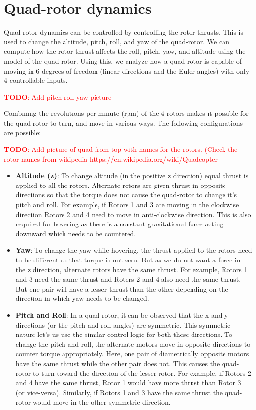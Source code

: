 \documentclass[BTech]{iitmdiss}
\newcommand\todo[1]{\textcolor{red}{{\bf TODO}: #1}}
\begin{document}
\chapter{Quad-rotor dynamics}

Quad-rotor dynamics can be controlled by controlling the rotor thrusts. This is used to change the altitude, pitch, roll, and yaw of the quad-rotor. We can compute how the rotor thrust affects the roll, pitch, yaw, and altitude using the model of the quad-rotor. Using this, we analyze how a quad-rotor is capable of moving in 6 degrees of freedom (linear directions and the Euler angles) with only 4 controllable inputs.

\todo{Add pitch roll yaw picture}

Combining the revolutions per minute (rpm) of the 4 rotors makes it possible for the quad-rotor to turn, and move in various ways. The following configurations are possible:

\todo{Add picture of quad from top with names for the rotors. (Check the rotor names from wikipedia https://en.wikipedia.org/wiki/Quadcopter}

\begin{itemize}
\item{{\bf Altitude (z)}: To change altitude (in the positive z direction) equal thrust is applied to all the rotors. Alternate rotors are given thrust in opposite directions so that the torque does not cause the quad-rotor to change it's pitch and roll. For example, if Rotors 1 and 3 are moving in the clockwise direction Rotors 2 and 4 need to move in anti-clockwise direction. This is also required for hovering as there is a constant gravitational force acting downward which needs to be countered.}
\item{{\bf Yaw}: To change the yaw while hovering, the thrust applied to the rotors need to be different so that torque is not zero. But as we do not want a force in the z direction, alternate rotors have the same thrust. For example, Rotors 1 and 3 need the same thrust and Rotors 2 and 4 also need the same thrust. But one pair will have a lesser thrust than the other depending on the direction in which yaw needs to be changed.}
\item{{\bf Pitch and Roll}: In a quad-rotor, it can be observed that the x and y directions (or the pitch and roll angles) are symmetric. This symmetric nature let's us use the similar control logic for both these directions. To change the pitch and roll, the alternate motors move in opposite directions to counter torque appropriately. Here, one pair of diametrically opposite motors have the same thrust while the other pair does not. This causes the quad-rotor to turn toward the direction of the lesser rotor. For example, if Rotors 2 and 4 have the same thrust, Rotor 1 would have more thrust than Rotor 3 (or vice-versa). Similarly, if Rotors 1 and 3 have the same thrust the quad-rotor would move in the other symmetric direction.}
\end{itemize}
\end{document}
